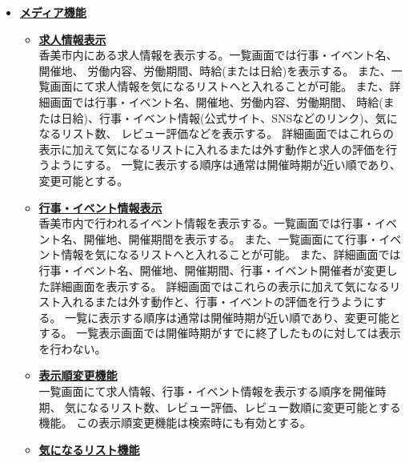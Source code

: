 \documentclass[a4paper,dvipdfmx]{jarticle}
\begin{document}
\begin{itemize}
\begin{itemize}
                  操作方法等の質問をメール形式で送信することが可能となっている。質問への回答はアプリ利用者が登録したメールアドレスへ送信される。
              \item[-] \underline{\textbf{パスワード変更機能}}\\
                  パスワードを作成条件下で任意に変更する機能。
          \end{itemize}
    \item \underline{\textbf{メディア機能}}
          \begin{itemize}
              \item[-] \underline{\textbf{求人情報表示}}\\
                  香美市内にある求人情報を表示する。一覧画面では行事・イベント名、開催地、
                  労働内容、労働期間、時給(または日給)を表示する。
                  また、一覧画面にて求人情報を気になるリストへと入れることが可能。
                  また、詳細画面では行事・イベント名、開催地、労働内容、労働期間、
                  時給(または日給)、行事・イベント情報(公式サイト、SNSなどのリンク)、気になるリスト数、
                  レビュー評価などを表示する。
                  詳細画面ではこれらの表示に加えて気になるリストに入れるまたは外す動作と求人の評価を行うようにする。
                  一覧に表示する順序は通常は開催時期が近い順であり、変更可能とする。
              \item[-] \underline{\textbf{行事・イベント情報表示}}\\
                  香美市内で行われるイベント情報を表示する。一覧画面では行事・イベント名、開催地、開催期間を表示する。
                  また、一覧画面にて行事・イベント情報を気になるリストへと入れることが可能。
                  また、詳細画面では行事・イベント名、開催地、開催期間、行事・イベント開催者が変更した詳細画面を表示する。
                  詳細画面ではこれらの表示に加えて気になるリスト入れるまたは外す動作と、行事・イベントの評価を行うようにする。
                  一覧に表示する順序は通常は開催時期が近い順であり、変更可能とする。
                  一覧表示画面では開催時期がすでに終了したものに対しては表示を行わない。
              \item[-] \underline{\textbf{表示順変更機能}}\\
                  一覧画面にて求人情報、行事・イベント情報を表示する順序を開催時期、
                  気になるリスト数、レビュー評価、レビュー数順に変更可能とする機能。
                  この表示順変更機能は検索時にも有効とする。
              \item[-] \underline{\textbf{気になるリスト機能}}\\

\end{itemize}
\end{itemize}
\end{document}
